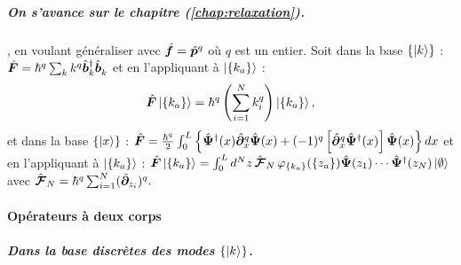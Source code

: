 \begin{mdframed}[
	linewidth=0.5pt, 
	backgroundcolor=gray!5, 
	roundcorner=50pt,	
	innerleftmargin=5pt,
    innerrightmargin=5pt,
    innertopmargin=-10pt,
    innerbottommargin=2pt,
    leftmargin=2pt,
    rightmargin=2pt
	]
\subparagraph{On s'avance sur le chapitre (\ref{chap:relaxation}).} , en voulant généraliser avec $\hat{\bm{f}} = \hat{\bm{p}}^q$ où $q$ est un entier. Soit dans la base \(\{\ket{k}\}\) : \(\hat{\bm{F}} = \hbar^q \sum_k k^q \hat{\bm{b}}_k^\dagger \hat{\bm{b}}_k^{} \) et en l'appliquant à \(\ket{\{k_a\}}\) :  
\begin{eqnarray}\label{chap.1:eq.rapel.opp.1.second.3}
	 \hat{\bm{F}} \ket{\{k_a\}} = \hbar^q \left( \sum_{i = 1}^N k_i^q \right) \ket{\{k_a\}},
\end{eqnarray}
et dans la base \(\{\ket{x}\}\) : 	
\(
	\hat{\bm{F}}  =  \frac{\hbar^q}2 \int_0^L \left \{  \hat{\bm{\Psi}}^\dag(x) \hat{\bm{\partial}}_x^q \hat{\bm{\Psi}}(x) + (-1)^q \left [\hat{\bm{\partial}}_x^q \hat{\bm{\Psi}}^\dag(x)\right ]\hat{\bm{\Psi}}(x)\right \} dx
\)
et en l'appliquant à \(\ket{\{k_a\}}\) : 
\(
	\hat{\bm{F}}\ket{ \{k_a\}} =  \int_0^L d^N z \, \hat{\bm{\mathcal{F}}}_N \, \varphi_{\{k_a\}}(\{z_a\} ) \hat{\bm{\Psi}}(z_1) \cdots \hat{\bm{\Psi}}^\dag(z_N) \ket{\emptyset}\, 
\) \mbox{avec} 
\(\hat{\bm{\mathcal{F}}}_N = \hbar^q \sum_{i=1}^N (\hat{\bm{\partial}}_{z_i})^q.
\)
\end{mdframed}

\paragraph{Opérateurs à deux corps}

\subparagraph{Dans la base discrètes des modes \( \{ \ket{k} \} \).}

